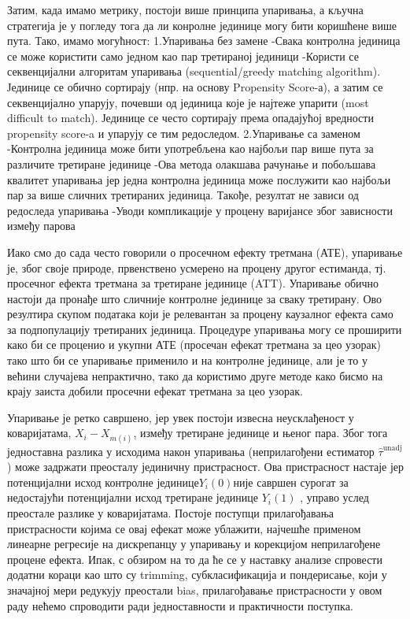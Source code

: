 \documentclass[12pt, a4paper]{article}
\begin{document}
Затим, када имамо метрику, постоји више принципа упаривања, а кључна стратегија је у погледу тога да ли конролне јединице могу бити коришћене више пута. Тако, имамо могућност:
1.Упаривања без замене
-Свака контролна јединица се може користити само једном као пар третираној јединици
-Користи се секвенцијални алгоритам упаривања (sequential/greedy matching algorithm). Јединице се обично сортирају (нпр. на основу Propensity Score-а), а затим се секвенцијално упарују, почевши од јединица које је најтеже упарити (most difficult to match). Јединице се често сортирају према опадајућој вредности propensity score-a и упарују се тим редоследом.
2.Упаривање са заменом
-Контролна јединица може бити употребљена као најбољи пар више пута за различите третиране јединице
-Ова метода олакшава рачунање и побољшава квалитет упаривања јер једна контролна јединица може послужити као најбољи пар за више сличних третираних јединица. Такође, резултат не зависи од редоследа упаривања
-Уводи компликације у процену варијансе због зависности између парова

Иако смо до сада често говорили о просечном ефекту третмана (АТЕ), упаривање је, због своје природе, првенствено усмерено на процену другог естиманда, тј. просечног ефекта третмана за третиране јединице (ATT). Упаривање обично настоји да пронађе што сличније контролне јединице за сваку третирану. Ово резултира скупом података који је релевантан за процену каузалног ефекта само за подпопулацију третираних јединица. Процедуре упаривања могу се проширити како би се проценио и укупни АТЕ (просечан ефекат третмана за цео узорак) тако што би се упаривање применило и на контролне јединице, али је то у већини случајева непрактично, тако да користимо друге методе како бисмо на крају заиста добили просечни ефекат третмана за цео узорак.

Упаривање је ретко савршено, јер увек постоји извесна неусклађеност у коваријатама, $X_i - X_{m(i)}$, између третиране јединице и њеног пара. Због тога једноставна разлика у исходима након упаривања (неприлагођени естиматор $\hat{\tau}^{\text{unadj}}$) може задржати преосталу јединичну пристрасност. Ова пристрасност настаје јер потенцијални исход контролне јединице$ Y_i(0)$није савршен сурогат за недостајући потенцијални исход третиране јединице  $Y_i(1)$ , управо услед преостале разлике у коваријатама. Постоје поступци прилагођавања пристрасности  којима се овај ефекат може ублажити, најчешће применом линеарне регресије на дискрепанцу у упаривању и корекцијом неприлагођене процене ефекта. Ипак, с обзиром на то да ће се у наставку анализе спровести додатни кораци као што су trimming, субкласификација и пондерисање, који у значајној мери редукују преостали bias, прилагођавање пристрасности у овом раду нећемо спроводити ради једноставности и практичности поступка.
\end{document}
